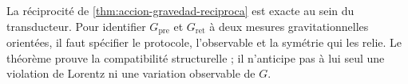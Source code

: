 \begin{remark}
La réciprocité de \cref{thm:accion-gravedad-reciproca} est exacte au sein du
transducteur. Pour identifier \(G_{\mathrm{pre}}\) et \(G_{\mathrm{ret}}\) à deux
mesures gravitationnelles orientées, il faut spécifier le protocole,
l’observable et la symétrie qui les relie. Le théorème prouve la
compatibilité structurelle ; il n’anticipe pas à lui seul une violation de Lorentz
ni une variation observable de \(G\).
\end{remark}

